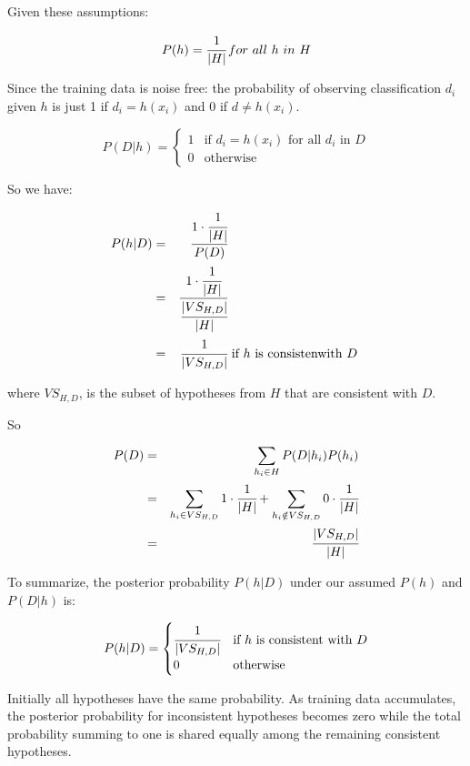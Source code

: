 Given these assumptions:

\[P(h)=\cfrac{1}{|H|}\, for\ all\ h\ in\ H\\\]

Since the training data is noise free: the probability of observing
classification \(d_i\) given \(h\) is just 1 if \(d_i=h(x_i)\) and 0 if
\(d\neq h(x_i)\).

\[P(D|h)=\begin{cases}
1 & \text{if }d_i=h(x_i)\text{ for all }d_i\text{ in }D\\
0 & \text{otherwise} 
\end{cases}\]

So we have:

\begin{equation*}
\begin{aligned}
P(h|D)&=&\cfrac{1\cdot\cfrac{1}{|H|}}{P(D)}&\\
&=&\cfrac{1\cdot\cfrac{1}{|H|}}{\cfrac{|VS_{H,D}|}{|H|}}&\\
&=&\cfrac{1}{|VS_{H,D}|} &\text{ if }h\text{ is consistenwith }D\
\end{aligned}
\end{equation*}


where \(VS_{H,D}\), is the subset of hypotheses from \(H\) that are
consistent with \(D\).

So

\begin{equation*}
\begin{aligned}
P(D)&=&\sum_{h_i\in H}P(D|h_i)P(h_i)\\
&=&\sum_{h_i\in VS_{H,D}}1\cdot \cfrac{1}{|H|}+\sum_{h_i\notin VS_{H,D}}0\cdot\cfrac{1}{|H|}\\
&=&\cfrac{|VS_{H,D}|}{|H|}
\end{aligned}
\end{equation*}


To summarize, the posterior probability \(P(h|D)\) under our assumed
\(P(h)\) and \(P(D|h)\) is:

\[P(h|D)=\begin{cases}
\cfrac{1}{|VS_{H,D}|} & \text{if }h\text{ is consistent with }D\\
0 & \text{otherwise}
\end{cases}\]

Initially all hypotheses have the same probability. As training data
accumulates, the posterior probability for inconsistent hypotheses
becomes zero while the total probability summing to one is shared
equally among the remaining consistent hypotheses.


